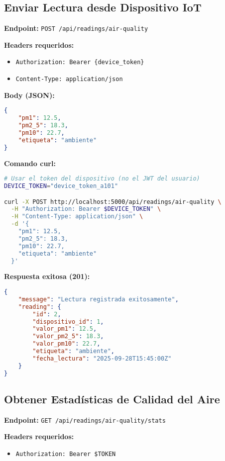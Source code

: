 \documentclass[12pt,a4paper]{article}
\begin{document}
\subsection{Enviar Lectura desde Dispositivo IoT}

\textbf{Endpoint:} \texttt{POST /api/readings/air-quality}

\textbf{Headers requeridos:}
\begin{itemize}
\item \texttt{Authorization: Bearer \{device\_token\}}
\item \texttt{Content-Type: application/json}
\end{itemize}

\textbf{Body (JSON):}
\begin{lstlisting}[language=JSON]
{
    "pm1": 12.5,
    "pm2_5": 18.3,
    "pm10": 22.7,
    "etiqueta": "ambiente"
}
\end{lstlisting}

\textbf{Comando curl:}
\begin{lstlisting}[language=bash]
# Usar el token del dispositivo (no el JWT del usuario)
DEVICE_TOKEN="device_token_a101"

curl -X POST http://localhost:5000/api/readings/air-quality \
  -H "Authorization: Bearer $DEVICE_TOKEN" \
  -H "Content-Type: application/json" \
  -d '{
    "pm1": 12.5,
    "pm2_5": 18.3,
    "pm10": 22.7,
    "etiqueta": "ambiente"
  }'
\end{lstlisting}

\textbf{Respuesta exitosa (201):}
\begin{lstlisting}[language=JSON]
{
    "message": "Lectura registrada exitosamente",
    "reading": {
        "id": 2,
        "dispositivo_id": 1,
        "valor_pm1": 12.5,
        "valor_pm2_5": 18.3,
        "valor_pm10": 22.7,
        "etiqueta": "ambiente",
        "fecha_lectura": "2025-09-28T15:45:00Z"
    }
}
\end{lstlisting}

\subsection{Obtener Estadísticas de Calidad del Aire}

\textbf{Endpoint:} \texttt{GET /api/readings/air-quality/stats}

\textbf{Headers requeridos:}
\begin{itemize}
\item \texttt{Authorization: Bearer \$TOKEN}
\end{itemize}
\end{document}
